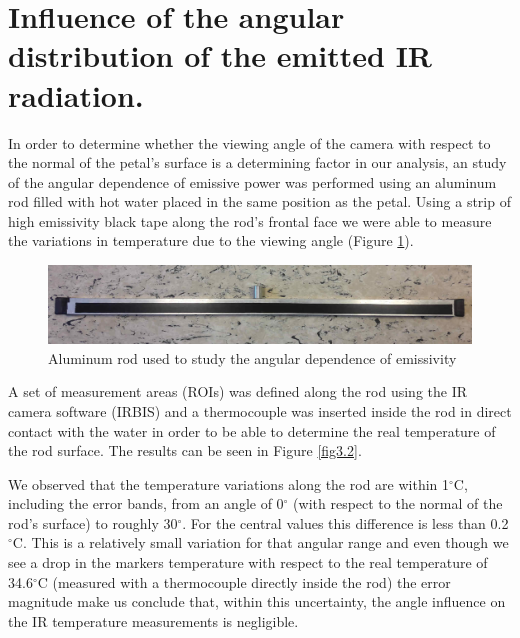 	\section{Influence of the angular distribution of the emitted IR radiation.}\label{section3.2}
	
		In order to determine whether the viewing angle of the camera with respect to the normal of the petal's surface is a determining factor in our analysis, an study of the angular dependence of emissive power was performed using an aluminum rod filled with hot water placed in the same position as the petal. Using a strip of high emissivity black tape along the rod’s frontal face we were able to measure the variations in temperature due to the viewing angle (Figure \ref{fig3.1}).
	
		\begin{figure}[ht!]
			\centering
			\captionsetup{justification=centering,margin=2cm}
			\includegraphics[scale=0.30]{Figures/Chapter03/AluminumRod.jpg}
			\caption{Aluminum rod used to study the angular dependence of emissivity}\label{fig3.1}
		\end{figure}		
	
		A set of measurement areas (ROIs) was defined along the rod using the IR camera software (IRBIS) and a thermocouple was inserted inside the rod in direct contact with the water in order to be able to determine the real temperature of the rod surface. The results can be seen in Figure \ref{fig3.2}. 
		
		We observed that the temperature variations along the rod are within 1$^{\circ}$C, including the error bands, from an angle of 0$^\circ$ (with respect to the normal of the rod’s surface) to roughly 30$^\circ$. For the central values this difference is less than 0.2$^{\circ}$C. This is a relatively small variation for that angular range and even though we see a drop in the markers temperature with respect to the real temperature of 34.6$^{\circ}$C (measured with a thermocouple directly inside the rod) the error magnitude make us conclude that, within this uncertainty, the angle influence on the IR temperature measurements is negligible.
		

